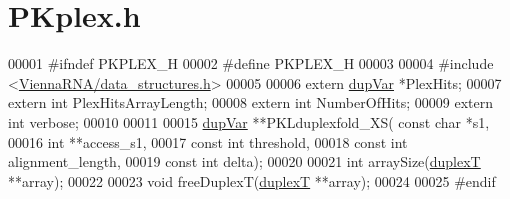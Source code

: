 \hypertarget{PKplex_8h_source}{\section{P\+Kplex.\+h}
\label{PKplex_8h_source}
}

\begin{DoxyCode}
00001 \textcolor{preprocessor}{#ifndef PKPLEX\_H}
00002 \textcolor{preprocessor}{#define PKPLEX\_H}
00003 
00004 \textcolor{preprocessor}{#include <\hyperlink{data__structures_8h}{ViennaRNA/data\_structures.h}>}
00005 
00006 \textcolor{keyword}{extern} \hyperlink{group__data__structures_structdupVar}{dupVar} *PlexHits;
00007 \textcolor{keyword}{extern} \textcolor{keywordtype}{int}    PlexHitsArrayLength;
00008 \textcolor{keyword}{extern} \textcolor{keywordtype}{int}    NumberOfHits;
00009 \textcolor{keyword}{extern} \textcolor{keywordtype}{int}    verbose;
00010 
00011 
00015 \hyperlink{group__data__structures_structdupVar}{dupVar}  **PKLduplexfold\_XS( \textcolor{keyword}{const} \textcolor{keywordtype}{char} *s1,
00016                             \textcolor{keywordtype}{int} **access\_s1,
00017                             \textcolor{keyword}{const} \textcolor{keywordtype}{int} threshold,
00018                             \textcolor{keyword}{const} \textcolor{keywordtype}{int} alignment\_length,
00019                             \textcolor{keyword}{const} \textcolor{keywordtype}{int} delta);
00020 
00021 \textcolor{keywordtype}{int}     arraySize(\hyperlink{group__data__structures_structduplexT}{duplexT} **array);
00022 
00023 \textcolor{keywordtype}{void}    freeDuplexT(\hyperlink{group__data__structures_structduplexT}{duplexT} **array);
00024 
00025 \textcolor{preprocessor}{#endif}
\end{DoxyCode}
